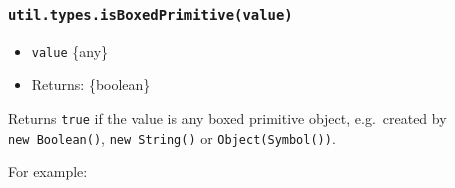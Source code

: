 \begin{Shaded}
\begin{Highlighting}[]
\NormalTok{(}\NormalTok{)}\OperatorTok{;}  
\NormalTok{(}\NormalTok{)}\OperatorTok{;}   
\NormalTok{(} \NormalTok{(}\NormalTok{))}\OperatorTok{;} 
\NormalTok{(} \NormalTok{(}\NormalTok{))}\OperatorTok{;}  
\NormalTok{(}\NormalTok{(}\NormalTok{))}\OperatorTok{;} 
\NormalTok{(}\NormalTok{(}\NormalTok{))}\OperatorTok{;}  
\end{Highlighting}
\end{Shaded}

\subsubsection{\texorpdfstring{\texttt{util.types.isBoxedPrimitive(value)}}{util.types.isBoxedPrimitive(value)}}\label{util.types.isboxedprimitivevalue}

\begin{itemize}
\tightlist
\item
  \texttt{value} \{any\}
\item
  Returns: \{boolean\}
\end{itemize}

Returns \texttt{true} if the value is any boxed primitive object,
e.g.~created by \texttt{new\ Boolean()}, \texttt{new\ String()} or
\texttt{Object(Symbol())}.

For example:

